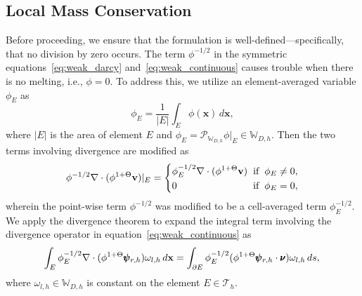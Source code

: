 \subsection{Local Mass Conservation}
Before proceeding, we ensure that the formulation is well-defined—specifically, 
that no division by zero occurs. 
The term $\phi^{-1/2}$ in the symmetric equations~\eqref{eq:weak_darcy} 
and~\eqref{eq:weak_continuous} causes trouble 
when there is no melting, i.e., $\phi = 0$.
To address this, we utilize an element-averaged variable $\phi_E$ as
\begin{equation}\label{eq:averaged_phi}
		  \phi_E = \frac{1}{\lvert E \rvert} \int_E \phi(\mathbf{x})\, d\mathbf{x},
\end{equation}
where $\lvert E \rvert$ is the area of element $E$ and 
$\phi_E = \mathcal{P}_{\mathbb{W}_{D,h}}\phi\rvert_E \in \mathbb{W}_{D,h}$. 
Then the two terms involving divergence are modified as
\begin{equation}\label{eq:newvariable_phi}
		  \phi^{-1/2}\nabla \cdot (\phi^{1+\Theta} \mathbf{v}) \rvert_E = \left\{
					 \begin{alignedat}{2}
								&\phi_E^{-1/2}\nabla \cdot (\phi^{1+\Theta} \mathbf{v})  \hspace{0.2cm} &&\text{if}\hspace{0.2cm} \phi_E \neq 0,\\
								&0 \hspace{0.5cm} &&\text{if} \hspace{0.2cm} \phi_E = 0,
					 \end{alignedat}
					 \right.
\end{equation}
wherein the point-wise term $\phi^{-1/2}$ was modified to be a cell-averaged term $\phi_E^{-1/2}$. 
We apply the divergence theorem to expand the integral term involving the
divergence operator in equation~\eqref{eq:weak_continuous} as
\begin{equation}\label{eq:divtheorem}
					 \int_E \phi_E^{-1/2} \nabla \cdot (\phi^{1+\Theta} \pmb{\psi}_{r,h})\omega_{l,h}\, d\mathbf{x} =\int_{\partial E} \phi_E^{-1/2} (\phi^{1+\Theta} \pmb{\psi}_{r,h}\cdot \pmb{\nu}) \omega_{l,h}\, ds, \\
\end{equation}
where $\omega_{l,h} \in \mathbb{W}_{D,h}$ is constant on the element $E \in \mathcal{T}_h$.
